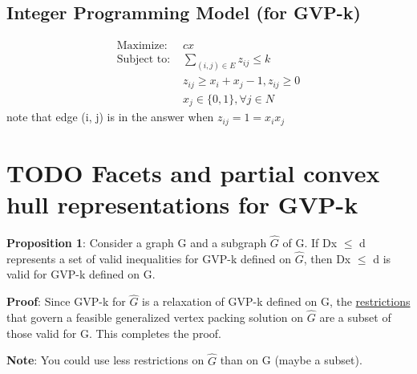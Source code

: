 \documentclass[11pt]{article}
\begin{document}
\subsection{Integer Programming Model (for GVP-k)}
\label{sec:org735cb32}
\begin{align*}
 \mbox{Maximize: } & cx \\
 \mbox{Subject to: } & \sum_{(i,j) \in E} z_{ij} \leq k \\
 & z_{ij} \geq x_i + x_j - 1, z_{ij} \geq 0 \\
 & x_j \in \{0, 1\}, \forall j \in N
\end{align*}
note that edge (i, j) is in the answer when \(z_{ij} = 1 = x_ix_j\)
\section{{\bfseries\sffamily TODO} Facets and partial convex hull representations for GVP-k}
\label{sec:org91dcc3f}
\textbf{Proposition 1}: Consider a graph G and a subgraph \(\hat{G}\) of G. 
If Dx \(\le\) d represents a set of valid inequalities for GVP-k deﬁned on \(\hat{G}\), 
then Dx \(\le\) d is valid for GVP-k deﬁned on G. 

\textbf{Proof}: Since GVP-k for \(\hat{G}\) is a relaxation of GVP-k deﬁned on G, 
the \uline{restrictions} that govern a feasible generalized vertex packing
solution on \(\hat{G}\) are a subset of those valid for G. This completes the proof.

\textbf{Note}: You could use less restrictions on \(\hat{G}\) than on G (maybe a subset).
\end{document}
